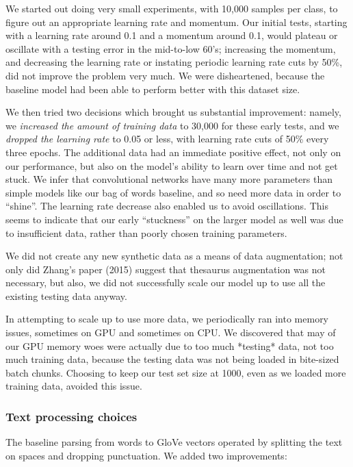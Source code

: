 \documentclass{article}
\begin{document}
We started out doing very small experiments, with 10,000 samples per class, to figure out an appropriate learning rate and momentum. Our initial tests, starting with a learning rate around 0.1 and a momentum around 0.1, would plateau or oscillate with a testing error in the mid-to-low 60's; increasing the momentum, and decreasing the learning rate or instating periodic learning rate cuts by 50\%, did not improve the problem very much. We were disheartened, because the baseline model had been able to perform better with this dataset size.

We then tried two decisions which brought us substantial improvement: namely, we \emph{increased the amount of training data} to 30,000 for these early tests, and we \emph{dropped the learning rate} to 0.05 or less, with learning rate cuts of 50\% every three epochs. The additional data had an immediate positive effect, not only on our performance, but also on the model's ability to learn over time and not get stuck. We infer that convolutional networks have many more parameters than simple models like our bag of words baseline, and so need more data in order to ``shine''. The learning rate decrease also enabled us to avoid oscillations. This seems to indicate that our early ``stuckness'' on the larger model as well was due to insufficient data, rather than poorly chosen training parameters.

We did not create any new synthetic data as a means of data augmentation; not only did Zhang's paper (2015) suggest that thesaurus augmentation was not necessary, but also, we did not successfully scale our model up to use all the existing testing data anyway.

In attempting to scale up to use more data, we periodically ran into memory issues, sometimes on GPU and sometimes on CPU. We discovered that may of our GPU memory woes were actually due to too much *testing* data, not too much training data, because the testing data was not being loaded in bite-sized batch chunks. Choosing to keep our test set size at 1000, even as we loaded more training data, avoided this issue.

\subsubsection*{Text processing choices}
The baseline parsing from words to GloVe vectors operated by splitting the text on spaces and dropping punctuation. We added two improvements:
\end{document}
